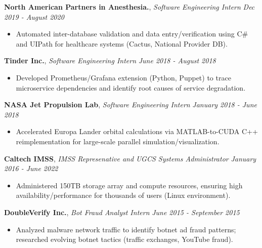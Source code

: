 \documentclass[8pt]{article}
\newenvironment{changemargin}[2]{%
  \begin{list}{}{%
    \setlength{\topsep}{0pt}%
    \setlength{\leftmargin}{#1}%
    \setlength{\rightmargin}{#2}%
    \setlength{\listparindent}{\parindent}%
    \setlength{\itemindent}{\parindent}%
    \setlength{\parsep}{0pt}%
    \setlength{\itemsep}{-2pt}%
  }%
  \item[]}{\end{list}
}
\newenvironment{body} {
	\vspace*{-10pt}
	\begin{changemargin}{-0.25in}{-0.5in}
  }	
	{\end{changemargin}
}
\begin{document}
\begin{body}
	\textbf{North American Partners in Anesthesia.}, \emph{Software Engineering Intern} \hfill
	\emph{Dec 2019 - August 2020}\\
	\vspace*{-5pt}
	\begin{itemize} \itemsep -2pt
		\item Automated inter-database validation and data entry/verification using C\# and UIPath for healthcare systems (Cactus, National Provider DB).
	\end{itemize}
	\vspace*{-6pt}

	\textbf{Tinder Inc.}, \emph{Software Engineering Intern} \hfill \emph{June 2018 - August 2018}\\
	\vspace*{-5pt}
	\begin{itemize} \itemsep -2pt
		\item Developed Prometheus/Grafana extension (Python, Puppet) to trace microservice dependencies and identify root causes of service degradation.
	\end{itemize}
	\vspace*{-6pt}

	\textbf{NASA Jet Propulsion Lab}, \emph{Software Engineering Intern} \hfill \emph{January 2018 - June 2018}\\
	\vspace*{-5pt}
	\begin{itemize} \itemsep -2pt
		\item Accelerated Europa Lander orbital calculations via MATLAB-to-CUDA C++ reimplementation for large-scale parallel simulation/visualization.
	\end{itemize}
	\vspace*{-6pt}

	\textbf{Caltech IMSS}, \emph{IMSS Represenative and UGCS Systems Administrator} \hfill \emph{January 2016 - June 2022}\\
	\vspace*{-6pt}
	\begin{itemize} \itemsep -2pt
		\item Administered 150TB storage array and compute resources, ensuring high availability/performance for thousands of users (Linux environment).
	\end{itemize}
	\vspace*{-6pt}

	\textbf{DoubleVerify Inc.}, \emph{Bot Fraud Analyst Intern} \hfill \emph{June 2015 - September 2015}\\
	\vspace*{-6pt}
	\begin{itemize} \itemsep -2pt
		\item Analyzed malware network traffic to identify botnet ad fraud patterns; researched evolving botnet tactics (traffic exchanges, YouTube fraud).
	\end{itemize}
	\vspace*{-6pt}


\end{body}
\end{document}
